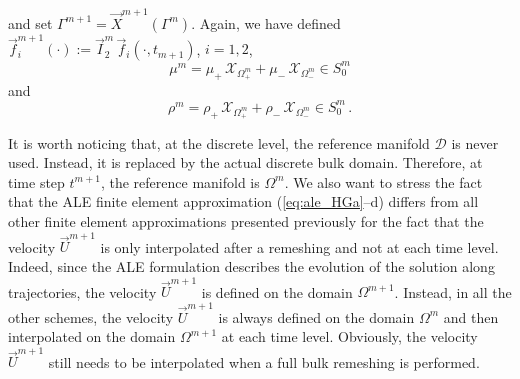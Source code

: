 \documentclass[a4paper,12pt,onecolumn]{article}
\newcommand{\D}{\mathcal D}
\newcommand{\bigchi}{\ensuremath{\mathrm{\mathcal{X}}}}
\newcommand{\charfcn}[1]{\bigchi_{#1}} %
\begin{document}
and set $\Gamma^{m+1} = \vec X^{m+1}(\Gamma^m)$. Again, we have defined
$\vec f_i^{m+1}(\cdot) := \vec I^m_2\,\vec f_i(\cdot,t_{m+1})$, $i=1,2$,
\begin{equation}
\mu^m = \mu_+\,\charfcn{\Omega^m_+} + \mu_-\,\charfcn{\Omega^m_-}\in S^m_0
\end{equation}
and
\begin{equation}
\rho^m = \rho_+\,\charfcn{\Omega^m_+} + \rho_-\,\charfcn{\Omega^m_-}\in S^m_0\,.
\end{equation}

It is worth noticing that, at the discrete level, the reference manifold $\D$
is never used. Instead, it is replaced by the actual discrete bulk domain.
Therefore, at time step $t^{m+1}$, the reference manifold is $\Omega^m$. We
also want to stress the fact that the ALE finite element approximation
(\ref{eq:ale_HGa}--d) differs from all other finite element approximations
presented previously for the fact that the velocity $\vec U^{m+1}$ is only
interpolated after a remeshing and not at each time level. Indeed, since the
ALE formulation describes the evolution of the solution along trajectories, the
velocity $\vec U^{m+1}$ is defined on the domain $\Omega^{m+1}$. Instead, in
all the other schemes, the velocity $\vec U^{m+1}$ is always defined on
the domain $\Omega^m$ and then interpolated on the domain $\Omega^{m+1}$ at
each time level. Obviously, the velocity $\vec U^{m+1}$ still needs to be
interpolated when a full bulk remeshing is performed.
\end{document}
